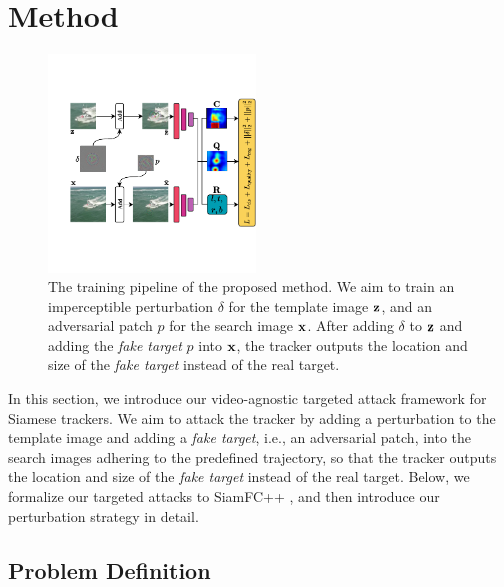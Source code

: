 \documentclass[journal]{IEEEtran}
\begin{document}
\section{Method}

\begin{figure}[t]
  \centering
  \includegraphics[width=0.49\textwidth]{images_imperceptible/network_v5.pdf}
  \caption{The training pipeline of the proposed method. We aim to train an imperceptible perturbation $\delta$ for the template image $\textbf z$, and an adversarial patch $p$ for the search image $\textbf x$. After adding $\delta$ to $\textbf z$ and adding the \textit{fake target} $p$ into $\textbf x$, the tracker outputs the location and size of the \textit{fake target} instead of the real target.}
  \label{fig:net}
\end{figure}

In this section, we introduce our video-agnostic targeted attack framework for Siamese trackers. We aim to attack the tracker by adding a perturbation to the template image and adding a \textit{fake target}, i.e., an adversarial patch, into the search images adhering to the predefined trajectory, so that the tracker outputs the location and size of the \textit{fake target} instead of the real target. Below, we formalize our targeted attacks to SiamFC++ \cite{SiamFC++}, and then introduce our perturbation strategy in detail.
 
\subsection{Problem Definition}
\end{document}
